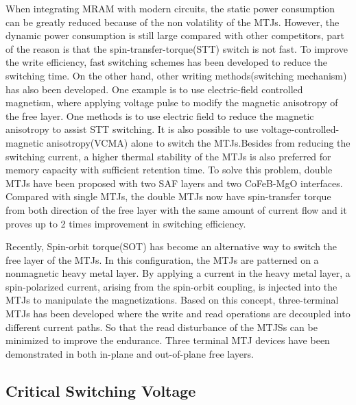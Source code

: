 When integrating MRAM with modern circuits, the static power consumption can be greatly reduced because of the non volatility of the MTJs. However, the dynamic power consumption is still large compared with other competitors, part of the reason is that the spin-transfer-torque(STT) switch is not fast\cite{STTslow}. To improve the write efficiency, fast switching schemes has been developed to reduce the switching time\cite{STTMTJswitch}\cite{fastswitch}. On the other hand, other writing methods(switching mechanism) has also been developed. One example is to use electric-field controlled magnetism, where applying voltage pulse to modify the magnetic anisotropy of the free layer\cite{VCMAtheory}. One methods is to use electric field to reduce the magnetic anisotropy to assist STT switching\cite{EswitchMTJ}. It is also possible to use voltage-controlled-magnetic anisotropy(VCMA) alone to switch the MTJs\cite{VCMA1}\cite{VCMA2}\cite{VCMA3}.Besides from reducing the switching current, a higher thermal stability of the MTJs is also preferred for memory capacity with sufficient retention time. To solve this problem, double MTJs have been proposed with two SAF layers and two CoFeB-MgO interfaces\cite{doubleMTJ1}\cite{doubleMTJ2}\cite{doubleMTJ3}. Compared with single MTJs, the double MTJs now have spin-transfer torque from both direction of the free layer with the same amount of current flow and it proves up to 2 times improvement in switching efficiency\cite{doubleMTJ4}.
 

Recently, Spin-orbit torque(SOT) has become an alternative way to switch the free layer of the MTJs. In this configuration, the MTJs are patterned on a nonmagnetic heavy metal layer. By applying a current in the heavy metal layer, a spin-polarized current, arising from the spin-orbit coupling, is injected into the MTJs to manipulate the magnetizations\cite{SOTMTJ}\cite{SOTMTJ2}. Based on this concept, three-terminal MTJs has been developed where the write and read operations are decoupled into different current paths. So that the read disturbance of the MTJSs can be minimized to improve the endurance. Three terminal MTJ devices have been demonstrated in both in-plane\cite{3MTJIr}\cite{3MTJTA}\cite{3MTJW} and out-of-plane\cite{3MTJPMA} free layers. 



  





\newpage



\subsection{Critical Switching Voltage}

